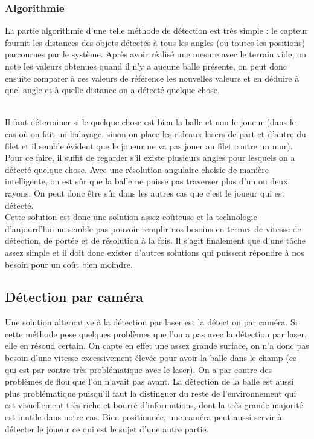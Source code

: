 \subsubsection{Algorithmie}

La partie algorithmie d'une telle méthode de détection est très simple : le capteur fournit les distances des objets détectés à tous les angles (ou toutes les positions) parcourues par le système. Après avoir réalisé une mesure avec le terrain vide, on note les valeurs obtenues quand il n'y a aucune balle présente, on peut donc ensuite comparer à ces valeurs de référence les nouvelles valeurs et en déduire à quel angle et à quelle distance on a détecté quelque chose. \\ 

Il faut déterminer si le quelque chose est bien la balle et non le joueur (dans le cas où on fait un balayage, sinon on place les rideaux lasers de part et d'autre du filet et il semble évident que le joueur ne va pas jouer au filet contre un mur). Pour ce faire, il suffit de regarder s'il existe plusieurs angles pour lesquels on a détecté quelque chose. Avec une résolution angulaire choisie de manière intelligente, on est sûr que la balle ne puisse pas traverser plus d'un ou deux rayons. On peut donc être sûr dans les autres cas que c'est le joueur qui est détecté.\\ 

Cette solution est donc une solution assez coûteuse et la technologie d'aujourd'hui ne semble pas pouvoir remplir nos besoins en termes de vitesse de détection, de portée et de résolution à la fois. Il s'agit finalement que d'une tâche assez simple et il doit donc exister d'autres solutions qui puissent répondre à nos besoin pour un coût bien moindre. 


\subsection{Détection par caméra}

Une solution alternative à la détection par laser est la détection par caméra. Si cette méthode pose quelques problèmes que l'on a pas avec la détection par laser, elle en résoud certain. On capte en effet une assez grande surface, on n'a donc pas besoin d'une vitesse excessivement élevée pour avoir la balle dans le champ (ce qui est par contre très problématique avec le laser). On a par contre des problèmes de flou que l'on n'avait pas avant. La détection de la balle est aussi plus problématique puisqu'il faut la distinguer du reste de l'environnement qui est visuellement très riche et bourré d'informations, dont la très grande majorité est inutile dans notre cas. Bien positionnée, une caméra peut aussi servir à détecter le joueur ce qui est le sujet d'une autre partie. \\ 

